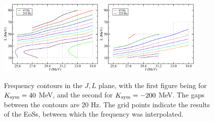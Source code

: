 \documentclass[fleqn,usenatbib]{mnras}
\begin{document}
\begin{figure}
\centering
\includegraphics[width=0.45\textwidth,angle=0]{contours_20gap_K40}
\includegraphics[width=0.45\textwidth,angle=0]{contours_20gap_Km200}
\caption{Frequency contours in the $J,L$ plane, with the first figure being for $K_{\rm sym}=40$ MeV, and the second for $K_{\rm sym}=-200$ MeV. The gaps between the contours are $20$ Hz. The grid points indicate the results of the EoSs, between which the frequency was interpolated.}
\label{fig:freq_contours}
\end{figure}
\end{document}
